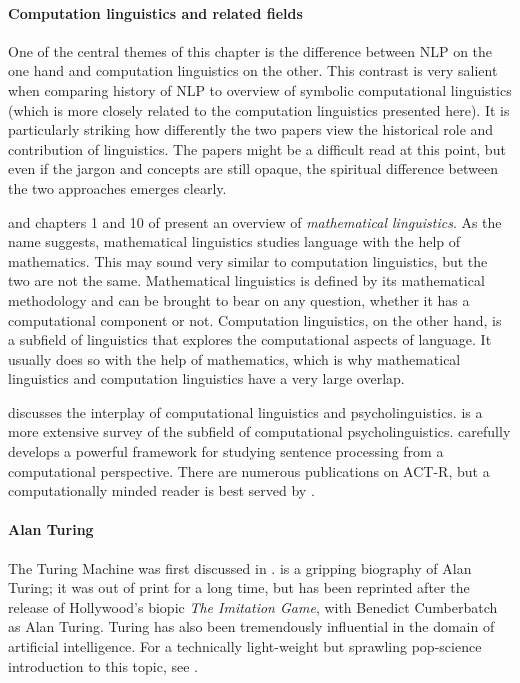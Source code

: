 \begin{literature}

\paragraph{Computation linguistics and related fields}
One of the central themes of this chapter is the difference between NLP on the one hand and computation linguistics on the other.
This contrast is very salient when comparing  history of NLP to  overview of symbolic computational linguistics (which is more closely related to the computation linguistics presented here).
It is particularly striking how differently the two papers view the historical role and contribution of linguistics.
The papers might be a difficult read at this point, but even if the jargon and concepts are still opaque, the spiritual difference between the two approaches emerges clearly.

\citet{PullumKornai03} and chapters 1 and 10 of \citet{Kornai07} present an overview of \emph{mathematical linguistics}.
As the name suggests, mathematical linguistics studies language with the help of mathematics.
This may sound very similar to computation linguistics, but the two are not the same.
Mathematical linguistics is defined by its mathematical methodology and can be brought to bear on any question, whether it has a computational component or not.
Computation linguistics, on the other hand, is a subfield of linguistics that explores the computational aspects of language.
It usually does so with the help of mathematics, which is why mathematical linguistics and computation linguistics have a very large overlap.

\citet{Krahmer10} discusses the interplay of computational linguistics and psycholinguistics.
\citet{Crocker10} is a more extensive survey of the subfield of computational psycholinguistics.
\citet{Hale14} carefully develops a powerful framework for studying sentence processing from a computational perspective.
There are numerous publications on ACT-R, but a computationally minded reader is best served by \citet{Whitehill13}.


\paragraph{Alan Turing}
The Turing Machine was first discussed in \citet{Turing36, Turing38}.
\citet{Hodges83} is a gripping biography of Alan Turing; it was out of print for a long time, but has been reprinted after the release of Hollywood's biopic \emph{The Imitation Game}, with Benedict Cumberbatch as Alan Turing.
Turing has also been tremendously influential in the domain of artificial intelligence. 
For a technically light-weight but sprawling pop-science introduction to this topic, see \citet{Hofstadter79}.


\end{literature}

